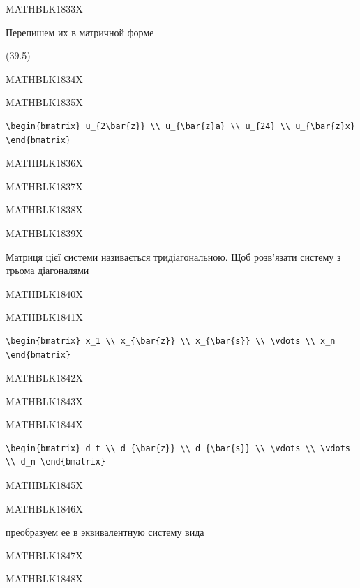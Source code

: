 \documentclass[
  ukrainian,
]{article}
\begin{document}
MATHBLK1833X

Перепишем их в матричной форме

(39.5)

MATHBLK1834X

MATHBLK1835X

\begin{verbatim}
\begin{bmatrix} u_{2\bar{z}} \\ u_{\bar{z}a} \\ u_{24} \\ u_{\bar{z}x} \end{bmatrix}
\end{verbatim}

MATHBLK1836X

MATHBLK1837X

MATHBLK1838X

MATHBLK1839X

Матриця цієї системи називається тридіагональною. Щоб розв'язати систему
з трьома діагоналями

MATHBLK1840X

MATHBLK1841X

\begin{verbatim}
\begin{bmatrix} x_1 \\ x_{\bar{z}} \\ x_{\bar{s}} \\ \vdots \\ x_n \end{bmatrix}
\end{verbatim}

MATHBLK1842X

MATHBLK1843X

MATHBLK1844X

\begin{verbatim}
\begin{bmatrix} d_t \\ d_{\bar{z}} \\ d_{\bar{s}} \\ \vdots \\ \vdots \\ d_n \end{bmatrix}
\end{verbatim}

MATHBLK1845X

MATHBLK1846X

преобразуем ее в эквивалентную систему вида

MATHBLK1847X

MATHBLK1848X
\end{document}
